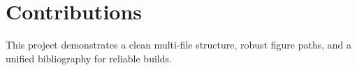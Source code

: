 \section{Contributions}
This project demonstrates a clean multi-file structure, robust figure paths, and a unified bibliography for reliable builds.
